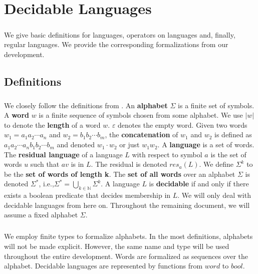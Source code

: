 \chapter{Decidable Languages}

\paragraph{}
We give basic definitions for languages, operators on languages and, finally, regular languages.
We provide the corresponding formalizations from our development.

\section{Definitions}
\paragraph{}
We closely follow the definitions from \cite{DBLP:books/daglib/0011126}.
An \textbf{alphabet} $\Sigma$ is a finite set of symbols. 
A \textbf{word} $w$ is a finite sequence of symbols chosen from some alphabet. 
We use $|w|$ to denote the \textbf{length} of a word $w$. $\varepsilon$ denotes the empty word.
Given two words $w_1 = a_1 a_2 \cdots a_n$ and $w_2 = b_1 b_2 \cdots b_m$, the \textbf{concatenation} of $w_1$ and $w_2$ is defined as $a_1 a_2 \cdots a_n b_1 b_2 \cdots b_m$ and denoted $w_1 \cdot w_2$ or just $w_1 w_2$.
A \textbf{language} is a set of words.
The \textbf{residual language} of a language $L$ with respect to symbol $a$ is the set of words $u$ such that $a v$ is in $L$. The residual is denoted $res_a(L)$.
We define $\Sigma^k$ to be the \textbf{set of words of length k}.
The \textbf{set of all words} over an alphabet $\Sigma$ is denoted $\Sigma^*$, i.e.,$\Sigma^* = \bigcup_{k \in \mathbb{N}} \Sigma^k$.
A language $L$ is \textbf{decidable} if and only if there exists a boolean predicate that decides membership in $L$.
We will only deal with decidable languages from here on.
Throughout the remaining document, we will assume a fixed alphabet $\Sigma$.

    \paragraph{} 
    We employ finite types to formalize alphabets. 
    In the most definitions, alphabets will not be made explicit.
    However, the same name and type will be used throughout the entire development.
    Words are formalized as sequences over the alphabet.
    Decidable languages are represented by functions from $word$ to $bool$.

